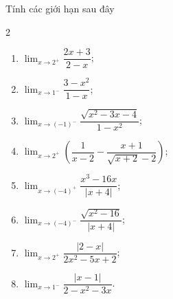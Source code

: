 \begin{ex}%

	 Tính các giới hạn sau đây
	\begin{multicols}{2}
		\begin{enumerate}
			\item $\displaystyle\lim_{x  \to 2^+} \dfrac{2x+3}{2-x}$;
			\item $\displaystyle\lim_{x \to  1^-} \dfrac{3-x^2}{1-x}$;
			\item  $\displaystyle\lim_{x \to \left(-1\right)^-} \dfrac{\sqrt{x^2-3x-4}}{1-x^2}$;
			\item $\displaystyle\lim_{x \to 2^+} \left(\dfrac{1}{x-2}-\dfrac{x+1}{\sqrt{x+2}-2}\right)$; 
			\item $\displaystyle\lim_{x \to \left(-4\right)^+} \dfrac{x^3-16x}{\left|x+4\right|}$; 
			\item $\displaystyle\lim_{x \to  \left(-4\right)^-} \dfrac{\sqrt{x^2-16}}{\left|x+4\right|}$;
			 \item $\displaystyle\lim_{x \to 2^+} \dfrac{\left|2-x\right|}{2x^2-5x+2}$;
			\item  $\displaystyle\lim_{x \to 1^-} \dfrac{\left|x-1\right|}{2-x^2-3x}$.
		\end{enumerate}
	\end{multicols}
\end{ex}
